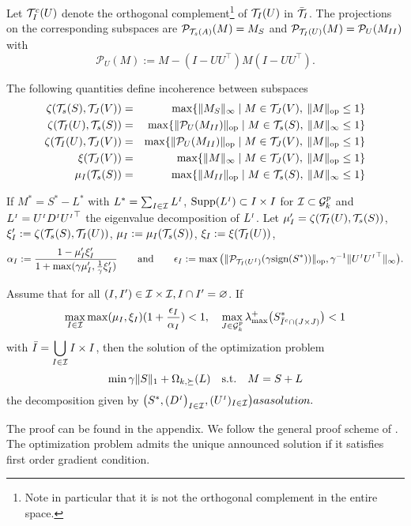 Let $\mathcal{T}^c_I(U)$ denote the orthogonal complement\footnote{Note in particular that it is not the orthogonal complement in the entire space.} of $\mathcal{T}_I(U)$ in $\bar{\mathcal{T}}_I$. The projections on the corresponding subspaces are $\mathcal{P}_{\mathcal{T}_s(A)}(M)=M_S$ and $\mathcal{P}_{\mathcal{T}_I(U)}(M)=\mathcal{P}_{U}(M_{II})$ with $$\mathcal{P}_U(M):=M-(I-UU^\top)M(I-UU^\top).$$ 

The following quantities define incoherence between subspaces
\begin{eqnarray*}
\zeta(\mathcal{T}_s(S),\mathcal{T}_J(V))&=&\max \{ {\|M_S\|_\infty} \mid M \in \mathcal{T}_J(V), \: \|M\|_{{\rm op}}\leq 1\}\\
\zeta(\mathcal{T}_I(U),\mathcal{T}_s(S))&=&\max \{ {\|\mathcal{P}_{U}(M_{II})\|_{{\rm op}}} \mid M \in \mathcal{T}_s(S), \: \|M\|_{\infty}\leq 1\}\\
\zeta(\mathcal{T}_I(U),\mathcal{T}_J(V))&=&\max \{ {\|\mathcal{P}_{U}(M_{II})\|_{{\rm op}}} \mid  M \in \mathcal{T}_J(V), \: \|M\|_{{\rm op}}\leq 1\}\\
\xi(\mathcal{T}_J(V))&=&\max \{ {\|M\|_\infty} \mid M \in \mathcal{T}_J(V), \: \|M\|_{{\rm op}}\leq 1\}\\
\mu_I(\mathcal{T}_s(S))&=&\max \{ {\|M_{II}\|_{\rm op}} \mid M \in \mathcal{T}_s(S), \: \|M\|_{\infty}\leq 1\}\\
\end{eqnarray*}

\begin{thm}
\label{theo:two}
If $M^*=S^*-L^*$ with $L^*=\sum_{I \in \mathcal{I}} L^{{\scriptscriptstyle I}}$, ${\rm Supp}(L^{{\scriptscriptstyle I}}) \subset I \times I$ for $\mathcal{I} \subset \mathcal{G}^p_k$ %
and $L^{{\scriptscriptstyle I}}=U^{{\scriptscriptstyle I}} D^{{\scriptscriptstyle I}} {U^{{\scriptscriptstyle I}}}^\top$ the eigenvalue decomposition of $L^{{\scriptscriptstyle I}}$.
Let $\mu'_I=\zeta(\mathcal{T}_I(U),\mathcal{T}_s(S))$, $\xi'_I :=\zeta(\mathcal{T}_s(S),\mathcal{T}_I(U))$, $\mu_I:=\mu_I(\mathcal{T}_s(S))$, $\xi_I:=\xi(\mathcal{T}_I(U))$,
$$\alpha_I:=\frac{1-\mu'_I\xi'_I}{1+\max(\gamma \mu'_I,\frac{1}{\gamma} \xi'_I)} \qquad \text{and} \qquad \epsilon_I :=\max \big (\|\mathcal{P}_{\mathcal{T}_I(U^{{\scriptscriptstyle I}})}(\gamma \text{sign}(S^*))\|_{{\rm op}}, \gamma^{-1}\|U^{{\scriptscriptstyle I}} {U^{{\scriptscriptstyle I}}}^\top\|_{\infty} \big ).$$

Assume that for all $(I,I') \in \mathcal{I} \times \mathcal{I}, I \cap I'=\varnothing$. If $$\displaystyle\max_{I \in \mathcal{I}} \max(\mu_I,\xi_I) (1+\frac{\epsilon_I}{\alpha_I})<1, \quad \displaystyle \max_{J \in \mathcal{G}^p_k} \lambda_{\max}^+\big (S^*_{\bar{I}^c \cap (J \times J)} \big ) <1$$ %
with $\displaystyle \bar{I}=\bigcup_{I \in \mathcal{I}} I \times I$,
then the solution of the optimization problem $$\displaystyle \min \gamma \|S\|_1+\Omega_{k,\succeq}(L) \quad \text{\text{s.t.}} \quad M=S+L$$
 the decomposition given by $\big (S^*,(D^{{\scriptscriptstyle I}} \big)_{I \in \mathcal{I}},(U^{{\scriptscriptstyle I}})_{I \in \mathcal{I}} \big ) as a solution.$ 
\end{thm}

The proof can be found in the appendix. We follow the general proof scheme of \citet{chandrasekaran2011rank}. The optimization problem admits the unique announced solution if it satisfies first order gradient condition.
